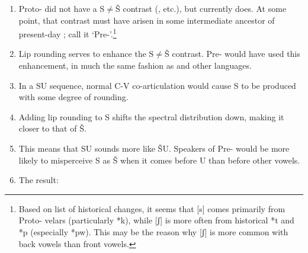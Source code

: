 \begin{enumerate}
\item 
Proto- did not have a S${\neq}$Š contrast (\citealt{Meinhof1932,Hyman:2003a}, etc.), but  currently does. At some point, that contrast must have arisen in some intermediate ancestor of present-day ; call it ‘Pre-’.\footnote{Based on  list of historical changes, it seems that [s] comes primarily from Proto- velars (particularly *k), while [ʃ] is more often from historical *t and *p (especially *pw). This may be the reason why [ʃ] is more common with back vowels than front vowels.}

\item Lip rounding serves to enhance the S${\neq}$Š contrast. Pre- would have used this enhancement, in much the same fashion as  and other languages.

\item In a SU sequence, normal C-V co-articulation would cause S to be produced with some degree of rounding.

\item Adding lip rounding to S shifts the spectral distribution down, making it closer to that of Š.

\item This means that SU sounds more like ŠU. Speakers of Pre- would be more likely to misperceive S as Š when it comes before U than before other vowels.

\item The result: 


\end{enumerate}
